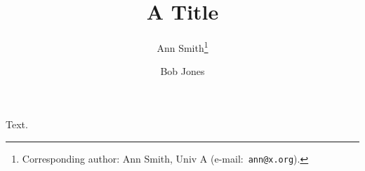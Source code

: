 \documentclass{article}
\def\email#1{\textrm{e-mail:~#1}}
\begin{document}
\title{A Title}
\author{Ann Smith\thanks{Corresponding author: Ann Smith, Univ A (\email{\tt ann@x.org}).} \and Bob Jones}
\maketitle
Text.
\end{document}
